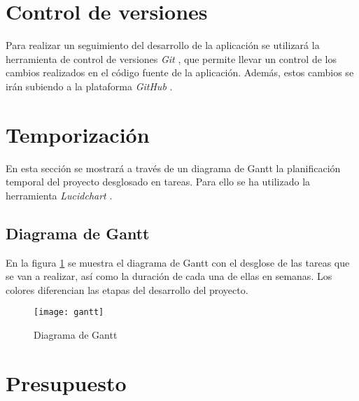\section{Control de versiones}
Para realizar un seguimiento del desarrollo de la aplicación se utilizará la
herramienta de control de versiones \textit{Git} \cite{git}, que permite llevar un
control de los cambios realizados en el código fuente de la aplicación. Además, estos
cambios se irán subiendo a la plataforma \textit{GitHub} \cite{github}.

\section{Temporización}
En esta sección se mostrará a través de un diagrama de Gantt la planificación
temporal del proyecto desglosado en tareas. Para ello se ha utilizado la
herramienta \textit{Lucidchart} \cite{lucidchart}.

\subsection{Diagrama de Gantt}
En la figura \ref{fig:gantt} se muestra el diagrama de Gantt con el desglose de las
tareas que se van a realizar, así como la duración de cada una de ellas en semanas.
Los colores diferencian las etapas del desarrollo del proyecto.
\begin{figure}[H]
  \centering
  \texttt{[image: gantt]}
  \caption{Diagrama de Gantt}
  \label{fig:gantt}
\end{figure}

\section{Presupuesto}
